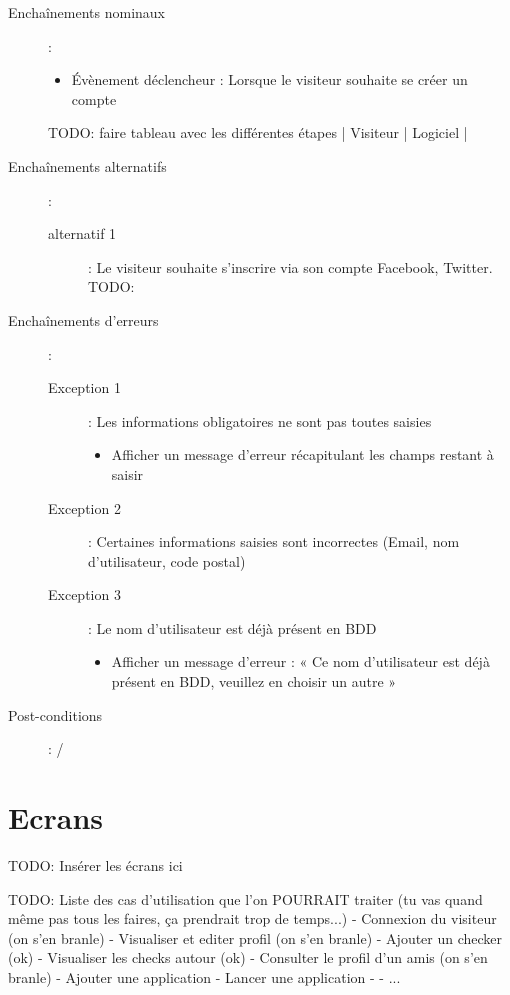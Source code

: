 \documentclass[a4paper,12pt]{report}
\begin{document}
\begin{onehalfspace}
\begin{description}
  \item[Enchaînements nominaux]:
    \begin{itemize}
      \item Évènement déclencheur : Lorsque le visiteur souhaite se créer un compte
    \end{itemize}

    TODO: faire tableau avec les différentes étapes | Visiteur | Logiciel |

  \item[Enchaînements alternatifs]:
    \begin{description}
      \item[alternatif 1]: Le visiteur souhaite s’inscrire via son compte Facebook, Twitter. TODO:
    \end{description}

  \item[Enchaînements d’erreurs]:
  \begin{description}
    \item[Exception 1]: Les informations obligatoires ne sont pas toutes saisies
    \begin{itemize}
      \item Afficher un message d’erreur récapitulant les champs restant à saisir
    \end{itemize}
    \item[Exception 2]: Certaines informations saisies sont incorrectes (Email, nom d’utilisateur, code postal)
    \item[Exception 3]: Le nom d’utilisateur est déjà présent en BDD
    \begin{itemize}
      \item Afficher un message d’erreur : « Ce nom d’utilisateur est déjà présent en BDD, veuillez en choisir un autre »
    \end{itemize}
  \end{description}

  \item[Post-conditions]: /
\end{description}

\section{Ecrans} %
\label{sec:ecrans}
TODO: Insérer les écrans ici

TODO: Liste des cas d'utilisation que l'on POURRAIT traiter (tu vas quand même pas tous les faires, ça prendrait trop de temps...)
- Connexion du visiteur (on s'en branle)
- Visualiser et editer profil (on s'en branle)
- Ajouter un checker (ok)
- Visualiser les checks autour (ok)
- Consulter le profil d'un amis (on s'en branle)
- Ajouter une application
- Lancer une application
-
- ...


\end{onehalfspace}
\end{document}
